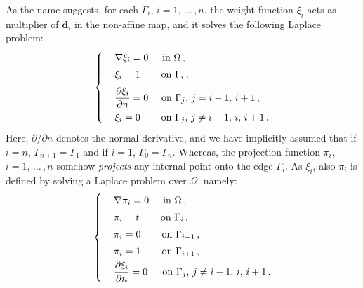 \documentclass[12pt, a4paper, twoside, openright]{report}
\numberwithin{equation}{chapter}
\theoremstyle{theorem}
\theoremstyle{definition}
\theoremstyle{remark}
\theoremstyle{proposition}
\numberwithin{figure}{chapter}
\newcommand{\bg}[1]{\boldsymbol{#1}}
\begin{document}
		As the name suggests, for each $\Gamma_i$, $i = 1, \, \ldots \, , n$, the weight function $\xi_i$ acts as multiplier of $\bg{d}_i$ in the non-affine map, and it solves the following Laplace problem:
		\begin{equation}
			\label{eq:laplace-problem-weight-function}
			\begin{cases}
				& \nabla \xi_i = 0 \hspace*{0.5cm} \text{in $\Omega$} \, , \\[0.1cm]
				& \xi_i = 1 \hspace*{0.755cm} \text{on $\Gamma_i$} \, , \\[0.2cm]
				& \dfrac{\partial \xi_i}{\partial n} = 0 \hspace*{0.475cm} \text{on $\Gamma_j$, $j = i-1, \, i+1$} \, , \\[0.2cm]
				& \xi_i = 0 \hspace*{0.755cm} \text{on $\Gamma_j$, $j \neq i-1, \, i, \, i+1$} \, .
			\end{cases}
		\end{equation}
		Here, $\partial / \partial n$ denotes the normal derivative, and we have implicitly assumed that if $i = n$, $\Gamma_{n+1} = \Gamma_1$ and if $i = 1$, $\Gamma_0 = \Gamma_n$. Whereas, the projection function $\pi_i$, $i = 1, \, \ldots \, , n$ somehow \emph{projects} any internal point onto the edge $\Gamma_i$. As $\xi_i$, also $\pi_i$ is defined by solving a Laplace problem over $\Omega$, namely:
		\begin{equation}
			\label{eq:laplace-problem-projection-function}
			\begin{cases}
				& \nabla \pi_i = 0 \hspace*{0.5cm} \text{in $\Omega$} \, , \\[0.1cm]
				& \pi_i = t \hspace*{0.76cm} \text{on $\Gamma_i$} \, , \\[0.1cm]
				& \pi_i = 0 \hspace*{0.755cm} \text{on $\Gamma_{i-1}$} \, , \\[0.1cm]
				& \pi_i = 1 \hspace*{0.755cm} \text{on $\Gamma_{i+1}$} \, , \\[0.1cm]
				& \dfrac{\partial \xi_i}{\partial n} = 0 \hspace*{0.53cm} \text{on $\Gamma_j$, $j \neq i-1, \, i, \, i+1$} \, .
			\end{cases}
		\end{equation}
\end{document}
